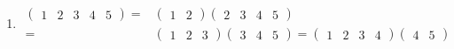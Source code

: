 \begin{example}[轮换的合并与截断]
\begin{enumerate}
	\item 
	\begin{equation}\begin{aligned}
	\begin{pmatrix}
	1&2&3&4&5
	\end{pmatrix}
	={}&\begin{pmatrix}
	1&2
	\end{pmatrix}
	\begin{pmatrix}
	2&3&4&5
	\end{pmatrix}\\
	={}&\begin{pmatrix}
	1&2&3
	\end{pmatrix}
	\begin{pmatrix}
	3&4&5
	\end{pmatrix}
	=\begin{pmatrix}
	1&2&3&4
	\end{pmatrix}
	\begin{pmatrix}
	4&5
	\end{pmatrix}
	\end{aligned}\end{equation}	
	

\end{enumerate}
\end{example}

